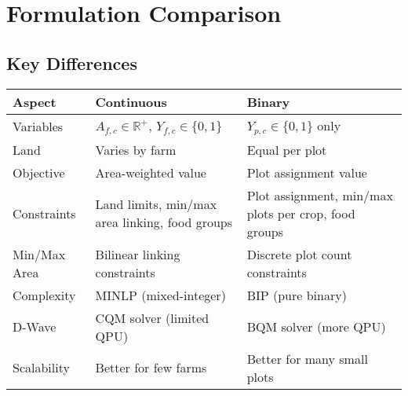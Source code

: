 \documentclass{article}
\begin{document}
\section{Formulation Comparison}

\subsection{Key Differences}

\begin{center}
\begin{tabular}{|l|p{5cm}|p{5cm}|}
\hline
\textbf{Aspect} & \textbf{Continuous} & \textbf{Binary} \\
\hline
Variables & $A_{f,c} \in \mathbb{R}^+$, $Y_{f,c} \in \{0,1\}$ & $Y_{p,c} \in \{0,1\}$ only \\
\hline
Land & Varies by farm & Equal per plot \\
\hline
Objective & Area-weighted value & Plot assignment value \\
\hline
Constraints & Land limits, min/max area linking, food groups & Plot assignment, min/max plots per crop, food groups \\
\hline
Min/Max Area & Bilinear linking constraints & Discrete plot count constraints \\
\hline
Complexity & MINLP (mixed-integer) & BIP (pure binary) \\
\hline
D-Wave & CQM solver (limited QPU) & BQM solver (more QPU) \\
\hline
Scalability & Better for few farms & Better for many small plots \\
\hline
\end{tabular}
\end{center}



\end{document}
